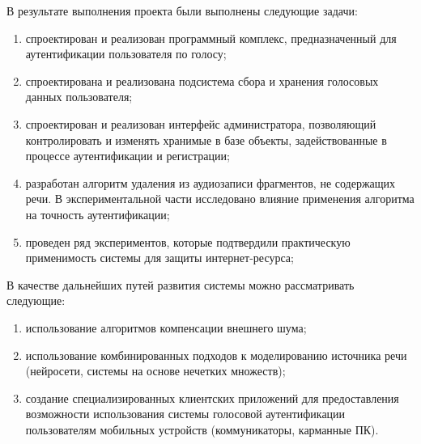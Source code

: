 \Outtro

В результате выполнения проекта были выполнены следующие задачи:

\begin{enumerate}
\item спроектирован и реализован программный комплекс, предназначенный для аутентификации
пользователя по голосу;
\item спроектирована и реализована подсистема сбора и хранения голосовых данных
пользователя;
\item спроектирован и реализован интерфейс администратора, позволяющий
контролировать и изменять хранимые в базе объекты, задействованные в процессе
аутентификации и регистрации;
\item разработан алгоритм удаления из аудиозаписи фрагментов, не содержащих
речи. В экспериментальной части исследовано влияние применения алгоритма на
точность аутентификации;
\item проведен ряд экспериментов, которые 
подтвердили практическую применимость системы для защиты интернет-ресурса;
\end{enumerate}

В качестве дальнейших путей развития системы можно рассматривать следующие:

\begin{enumerate}
\item использование алгоритмов компенсации внешнего шума;
\item использование комбинированных подходов к моделированию источника речи
(нейросети, системы на основе нечетких множеств);
\item создание специализированных клиентских приложений для предоставления
возможности использования системы
голосовой аутентификации пользователям мобильных устройств (коммуникаторы,
карманные ПК).
\end{enumerate}

